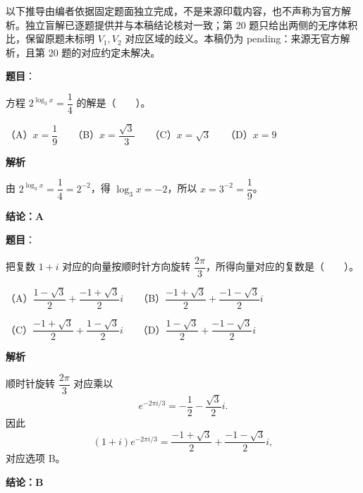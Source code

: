 

\begin{gktip}
以下推导由编者依据固定题面独立完成，不是来源印载内容，也不声称为官方解析。独立盲解已逐题提供并与本稿结论核对一致；第 20 题只给出两侧的无序体积比，保留原题未标明 $V_1,V_2$ 对应区域的歧义。本稿仍为 pending：来源无官方解析，且第 20 题的对应约定未解决。
\end{gktip}

\begin{answer}

\textbf{题目}：

方程 $2^{\log_3 x}=\dfrac14$ 的解是\mbox{（　　）}。

（A）$x=\dfrac19$　　（B）$x=\dfrac{\sqrt3}{3}$　　（C）$x=\sqrt3$　　（D）$x=9$

\textbf{解析}

由 $2^{\log_3x}=\dfrac14=2^{-2}$，得 $\log_3x=-2$，所以 $x=3^{-2}=\dfrac19$。

\textbf{结论：A}


\end{answer}
\begin{answer}

\textbf{题目}：

把复数 $1+i$ 对应的向量按顺时针方向旋转 $\dfrac{2\pi}{3}$，所得向量对应的复数是\mbox{（　　）}。

（A）$\dfrac{1-\sqrt3}{2}+\dfrac{-1+\sqrt3}{2}i$　　（B）$\dfrac{-1+\sqrt3}{2}+\dfrac{-1-\sqrt3}{2}i$

（C）$\dfrac{-1+\sqrt3}{2}+\dfrac{1-\sqrt3}{2}i$　　（D）$\dfrac{1-\sqrt3}{2}+\dfrac{-1-\sqrt3}{2}i$

\textbf{解析}

顺时针旋转 $\dfrac{2\pi}{3}$ 对应乘以
\nopagebreak[4]
\[
e^{-2\pi i/3}=-\frac12-\frac{\sqrt3}{2}i.
\]
因此
\nopagebreak[4]
\[
(1+i)e^{-2\pi i/3}
=\frac{-1+\sqrt3}{2}+\frac{-1-\sqrt3}{2}i,
\]
对应选项 B。

\textbf{结论：B}


\end{answer}
